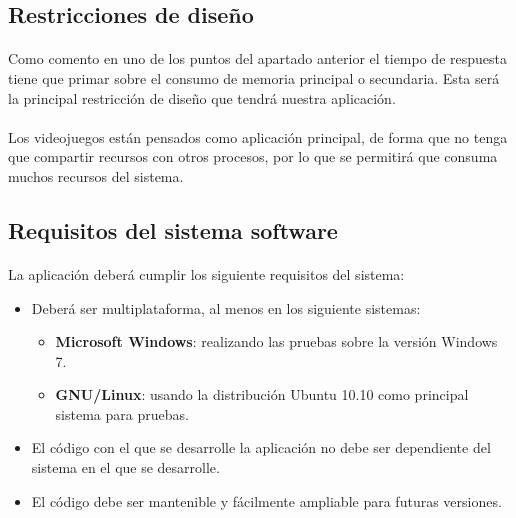 \subsection{Restricciones de diseño}

\paragraph{}
Como comento en uno de los puntos del apartado anterior el tiempo de respuesta tiene que primar sobre el consumo de 
memoria principal o secundaria. Esta será la principal restricción de diseño que tendrá nuestra aplicación.

\paragraph{}
Los videojuegos están pensados como aplicación principal, de forma que no tenga que compartir recursos con otros procesos,
por lo que se permitirá que consuma muchos recursos del sistema.

\subsection{Requisitos del sistema software}

\paragraph{}
La aplicación deberá cumplir los siguiente requisitos del sistema:

\begin{itemize}
    \item Deberá ser multiplataforma, al menos en los siguiente sistemas:
    \begin{itemize}
        \item \textbf{Microsoft Windows}: realizando las pruebas sobre la versión Windows 7.
        \item \textbf{GNU/Linux}: usando la distribución Ubuntu 10.10 como principal sistema para pruebas.
    \end{itemize}
    
    \item El código con el que se desarrolle la aplicación no debe ser
    dependiente del sistema en el que se desarrolle.
    
    \item El código debe ser mantenible y fácilmente ampliable para futuras versiones.
\end{itemize}

